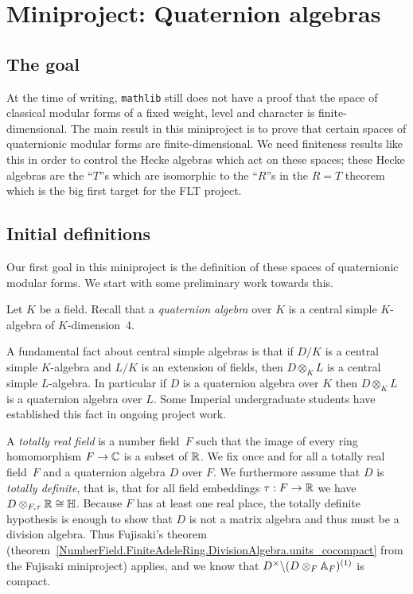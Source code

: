 \chapter{Miniproject: Quaternion algebras}\label{Quat_alg_project}

\section{The goal}

At the time of writing, {\tt mathlib} still does not have a proof that the space
of classical modular forms of a fixed weight, level and character is finite-dimensional.
The main result in this miniproject is to prove that certain spaces of quaternionic modular forms
are finite-dimensional. We need finiteness results
like this in order to control the Hecke algebras which act on these spaces; these Hecke
algebras are the ``$T$''s which are isomorphic to the ``$R$''s in the $R=T$ theorem which
is the big first target for the FLT project.

\section{Initial definitions}

Our first goal in this miniproject is the definition of these spaces of quaternionic modular forms.
We start with some preliminary work towards this.

Let $K$ be a field. Recall that a \emph{quaternion algebra}
over $K$ is a central simple $K$-algebra of $K$-dimension~4.

A fundamental fact about central simple algebras is that if $D/K$
is a central simple $K$-algebra and $L/K$ is an extension of fields, then $D\otimes_KL$
is a central simple $L$-algebra. In particular if $D$ is a quaternion algebra over $K$
then $D\otimes_KL$ is a quaternion algebra over $L$. Some Imperial undergraduate students have established
this fact in ongoing project work.

A \emph{totally real field} is a number field~$F$ such that the image of every ring
homomorphism $F\to\mathbb{C}$ is a subset of $\mathbb{R}$. We fix once and for all a totally real field~$F$ and a
quaternion algebra $D$ over $F$. We furthermore assume that $D$ is \emph{totally definite}, that is,
that for all field embeddings $\tau:F\to\mathbb{R}$ we have $D\otimes_{F,\tau}\mathbb{R}\cong\mathbb{H}$. Because $F$
has at least one real place, the totally definite hypothesis is enough to show that $D$
is not a matrix algebra and thus must be a division algebra. Thus Fujisaki's theorem (theorem~\ref{NumberField.FiniteAdeleRing.DivisionAlgebra.units_cocompact}
from the Fujisaki miniproject) applies, and we know that $D^\times\backslash (D\otimes_F\mathbb{A}_F)^{(1)}$
is compact.

